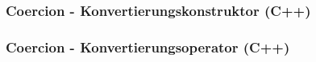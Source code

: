 {
\begin{frame}
	\frametitle{Coercion - Konvertierungskonstruktor (C++)}
	{\tiny\UseRawInputEncoding{}}
\end{frame}
}

{
\begin{frame}
	\frametitle{Coercion - Konvertierungsoperator (C++)}
	{\tiny\UseRawInputEncoding{}}
\end{frame}
}
